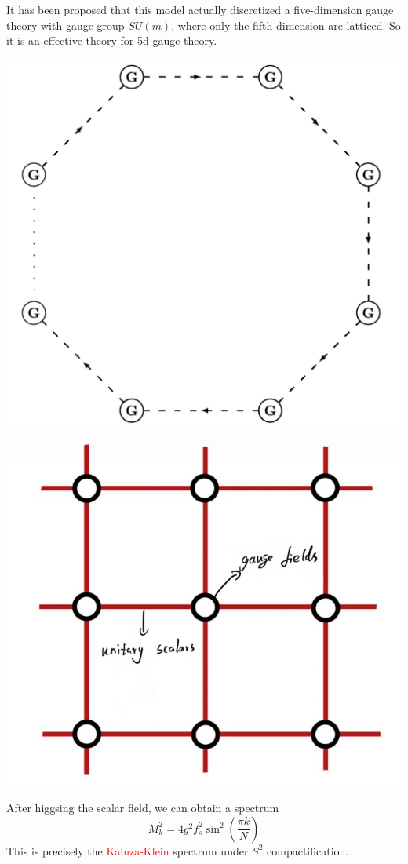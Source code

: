 \documentclass{beamer}
\begin{document}
\begin{frame}
    It has been proposed that this model actually discretized a five-dimension gauge theory with gauge group $SU(m)$, where 
    only the fifth dimension are latticed. So it is an effective theory for 5d gauge theory.
     \vspace{1em} %
    \begin{center}
    \begin{minipage}{0.45\textwidth}
        \centering
        \includegraphics[width=0.6\linewidth]{Moosed.jpeg} %
        \par\vspace{0.5em}
    \end{minipage}
    \hspace{0.05\textwidth}
    \begin{minipage}{0.45\textwidth}
        \centering
        \includegraphics[width=0.6\linewidth]{Lattice.jpg} %
        \par\vspace{0.5em}
    \end{minipage}
    \end{center}
    \pause
    After higgsing the scalar field, we can obtain a spectrum
    \begin{equation*}
        M_k^2=4g^2f_s^2\sin^2\left(\frac{\pi k}{N}\right)
    \end{equation*}
    This is precisely the \textcolor{red}{Kaluza-Klein} spectrum under $S^2$ compactification. 
\end{frame}
\end{document}
